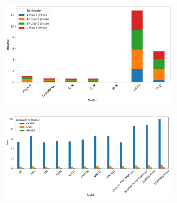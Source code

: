 \begin{figure}[H]
	\centering
	\caption{Análise comparativa dos modelos utilizando gráfico de barras \label{fig:rrmse_comparar} \label{fig:basic_comparar}}
	\begin{subfigure}{1\textwidth}
		\includegraphics[width=\linewidth]{Resultados/Figuras/rrmse_comparar}
	
		
	\end{subfigure}
	
	\begin{subfigure}{1\textwidth}
		\includegraphics[width=\linewidth]{Resultados/Figuras/basic_comparar}
		
		
	\end{subfigure}
	

\end{figure}

